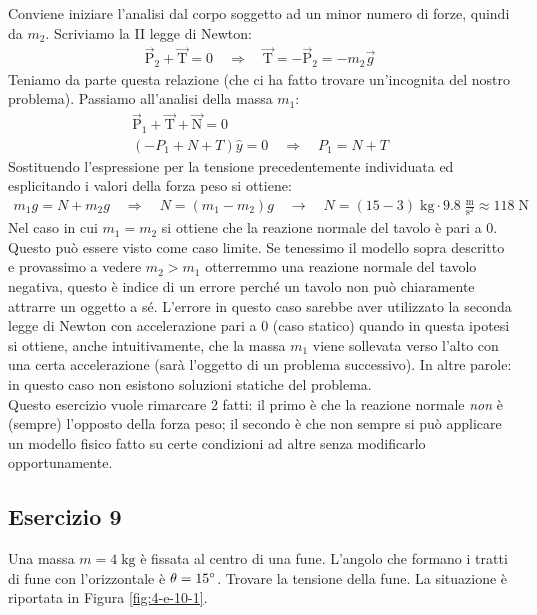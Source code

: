\documentclass[12pt,a4paper]{book}
\begin{document}
Conviene iniziare l'analisi dal corpo soggetto ad un minor numero di forze, quindi da $m_2$. Scriviamo la II legge di Newton:
%
\begin{gather*}
\vec{\text{P}}_2+\vec{\text{T}}=0 \quad \Longrightarrow \quad \vec{\text{T}}=-\vec{\text{P}}_2=-m_2\vec{g}
\end{gather*}
%
Teniamo da parte questa relazione (che ci ha fatto trovare un'incognita del nostro problema). Passiamo all'analisi della massa $m_1$:
%
\begin{gather*}
\vec{\text{P}}_1+\vec{\text{T}}+\vec{\text{N}}=0 \\
(-P_1+N+T)\hat{y}=0 \quad \Longrightarrow \quad P_1=N+T
\end{gather*}
%
Sostituendo l'espressione per la tensione precedentemente individuata ed esplicitando i valori della forza peso si ottiene:
%
\begin{gather*}
m_1g=N+m_2g \quad \Longrightarrow \quad N=(m_1-m_2)g \quad \rightarrow \quad N=(15-3)\;\text{kg} \cdot 9.8 \;\frac{\text{m}}{\text{s}^2} \approx 118\;\text{N}
\end{gather*}
%
Nel caso in cui $m_1=m_2$ si ottiene che la reazione normale del tavolo è pari a 0. Questo può essere visto come caso limite. Se tenessimo il modello sopra descritto e provassimo a vedere $m_2>m_1$ otterremmo una reazione normale del tavolo negativa, questo è indice di un errore perché un tavolo non può chiaramente attrarre un oggetto a sé. L'errore in questo caso sarebbe aver utilizzato la seconda legge di Newton con accelerazione pari a 0 (caso statico) quando in questa ipotesi si ottiene, anche intuitivamente, che la massa $m_1$ viene sollevata verso l'alto con una certa accelerazione (sarà l'oggetto di un problema successivo). In altre parole: in questo caso non esistono soluzioni statiche del problema. \\ 

Questo esercizio vuole rimarcare 2 fatti: il primo è che la reazione normale \textit{non} è (sempre) l'opposto della forza peso; il secondo è che non sempre si può applicare un modello fisico fatto su certe condizioni ad altre senza modificarlo opportunamente.

\subsection*{Esercizio 9}
Una massa $m=4\;\text{kg}$ è fissata al centro di una fune. L'angolo che formano i tratti di fune con l'orizzontale è $\theta=15\degree$. Trovare la tensione della fune. La situazione è riportata in Figura \ref{fig:4-e-10-1}.
\end{document}
